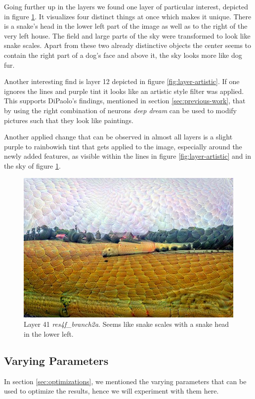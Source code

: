 Going further up in the layers we found one layer of particular interest, depicted in figure \ref{fig:layer-snake}.
It visualizes four distinct things at once which makes it unique.
There is a snake's head in the lower left part of the image as well as to the right of the very left house.
The field and large parts of the sky were transformed to look like snake scales.
Apart from these two already distinctive objects the center seems to contain the right part of a dog's face and above it, the sky looks more like dog fur.

Another interesting find is layer 12 depicted in figure \ref{fig:layer-artistic}.
If one ignores the lines and purple tint it looks like an artistic style filter was applied.
This supports DiPaolo's findings, mentioned in section \ref{sec:previous-work}, that by using the right combination of neurons \textit{deep dream} can be used to modify pictures such that they look like paintings.

Another applied change that can be observed in almost all layers is a slight purple to rainbowish tint that gets applied to the image, especially around the newly added features, as visible within the lines in figure \ref{fig:layer-artistic} and in the sky of figure \ref{fig:layer-snake}.

\begin{figure}[H]
	\centering
	\includegraphics[width=0.7\linewidth]{img/alpsted-landscape_res4f_branch2a.jpg}
	\caption{Layer 41 \emph{res4f\_branch2a}. Seems like snake scales with a snake head in the lower left.}
	\label{fig:layer-snake}
\end{figure}


\subsection{Varying Parameters}
\label{sec:varying-parameters}
In section \ref{sec:optimizations}, we mentioned the varying parameters that can be used to optimize the results, hence we will experiment with them here.

